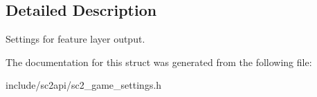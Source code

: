 \subsection{Detailed Description}
Settings for feature layer output. 

The documentation for this struct was generated from the following file\+:\begin{DoxyCompactItemize}
\item 
include/sc2api/sc2\+\_\+game\+\_\+settings.\+h\end{DoxyCompactItemize}
